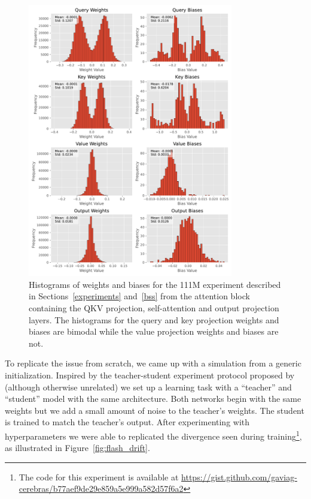\documentclass{article}
\begin{document}
\begin{figure}
    \centering
    \includegraphics[width=0.8\textwidth]{figures/sl718-controls-optional-hist.pdf}
    \caption{%
        Histograms of weights and biases for the 111M experiment described in
        Sections~\ref{experiments} and~\ref{bss} from the attention block
        containing the QKV projection, self-attention and output projection
        layers. The histograms for the query and key projection weights and
        biases are bimodal while the value projection weights and biases are
        not.}
    \label{fig:controls_optional}
\end{figure}

To replicate the issue from scratch, we came up with a simulation from a generic
initialization. Inspired by the teacher-student experiment protocol proposed by
\citet{ba2022high} (although otherwise unrelated) we set up a learning task with
a ``teacher'' and ``student'' model with the same architecture. Both networks
begin with the same weights but we add a small amount of noise to the teacher's
weights. The student is trained to match the teacher's output. After
experimenting with hyperparameters we were able to replicated the divergence
seen during training\footnote{The code for this experiment is available
at
\url{https://gist.github.com/gaviag-cerebras/b77aef9de29e859a5e999a582d57f6a2}},
as illustrated in Figure~\ref{fig:flash_drift}.
\end{document}
